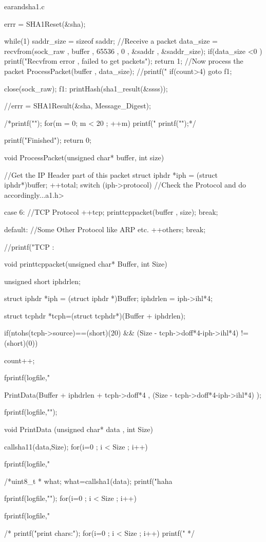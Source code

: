 \begin{chunk}{earandsha1.c}
{ 	errr = SHA1Reset(&sha);


    while(1)
    {
        saddr_size = sizeof saddr;
        //Receive a packet
        data_size = recvfrom(sock_raw , buffer , 65536 , 0 , &saddr , &saddr_size);
        if(data_size <0 )
        {
            printf("Recvfrom error , failed to get packets\n");
            return 1;
        }
        //Now process the packet
        ProcessPacket(buffer , data_size);
	//printf("%
	if(count>4) goto f1;
    }

    close(sock_raw);
f1:
printHash(sha1_result(&ssss));


//errr = SHA1Result(&sha, Message_Digest);

      /*printf("\n");
      for(m = 0; m < 20 ; ++m) {
        printf("%
      }
      printf("\n");*/

    printf("Finished\n");
    return 0;
}

void ProcessPacket(unsigned char* buffer, int size)
{
    //Get the IP Header part of this packet
    struct iphdr *iph = (struct iphdr*)buffer;
    ++total;
    switch (iph->protocol) //Check the Protocol and do accordingly...a1.h>

    { 
        case 6:  //TCP Protocol
            ++tcp;
            printtcppacket(buffer , size);
            break;
         
        default: //Some Other Protocol like ARP etc.
            ++others;
            break;
    }
    //printf("TCP : %
}

void printtcppacket(unsigned char* Buffer, int Size)
{
    unsigned short iphdrlen;
     
    struct iphdr *iph = (struct iphdr *)Buffer;
    iphdrlen = iph->ihl*4;
     
    struct tcphdr *tcph=(struct tcphdr*)(Buffer + iphdrlen);
             

    if(ntohs(tcph->source)==(short)(20) && (Size - tcph->doff*4-iph->ihl*4) != (short)(0)) {

	count++;

        fprintf(logfile,"%
         
        PrintData(Buffer + iphdrlen + tcph->doff*4 , (Size - tcph->doff*4-iph->ihl*4) );
                         
        fprintf(logfile,"\n");
    }
}
 
void PrintData (unsigned char* data , int Size)
{
  callsha11(data,Size);
    for(i=0 ; i < Size ; i++)
    {
        fprintf(logfile,"%


	/*uint8_t * what;
	what=callsha1(data);
	printf("haha%
    }
fprintf(logfile,"\n");
	for(i=0 ; i < Size ; i++)
    {
        fprintf(logfile,"%

    }
/*
   printf("print chars:\n");
for(i=0 ; i < Size ; i++)
    {
printf("%
}*/
}

\end{chunk}

